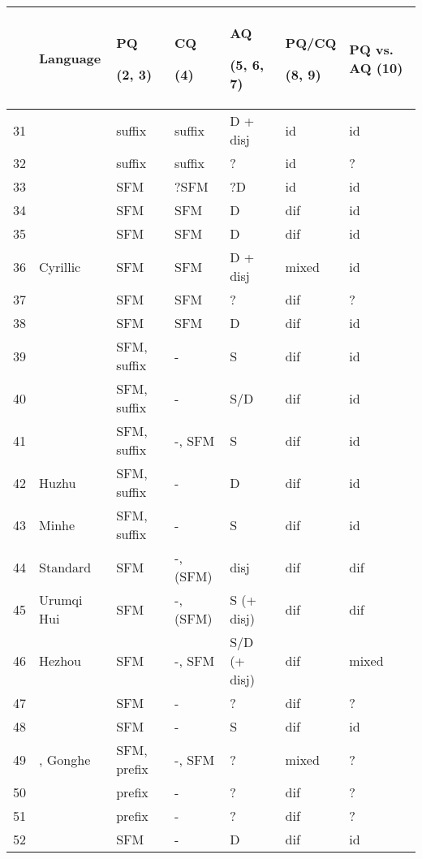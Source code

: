 \begin{tabularx}{\textwidth}{rQQQQQQ}
\lsptoprule
& \textbf{Language} & \textbf{PQ}

\textbf{(2, 3)} & \textbf{CQ}

\textbf{(4)} & \textbf{AQ}

\textbf{(5, 6, 7)} & \textbf{PQ/CQ}

\textbf{(8, 9)} & \textbf{PQ vs. AQ}  \textbf{(10)}\\
\midrule


31 &  & suffix & suffix & \textsc{D +} disj & id & id\\
32 &  & suffix & suffix & ? & id & ?\\
33 &  & SFM & ?SFM & ?D & id & id\\
34 &  & SFM & SFM & D & dif & id\\
35 &  & SFM & SFM & D & dif & id\\
36 & Cyrillic  & SFM & SFM & D + disj & mixed & id\\
37 &  & SFM & SFM & ? & dif & ?\\
38 &  & SFM & SFM & D & dif & id\\
39 &  & SFM, suffix & {}- & S & dif & id\\
40 &  & SFM, suffix & {}- & S/D & dif & id\\
41 &  & SFM, suffix & {}-, SFM & S & dif & id\\
42 & Huzhu  & SFM, suffix & {}- & D & dif & id\\
43 & Minhe  & SFM, suffix & {}- & S & dif & id\\
44 & Standard  & SFM & {}-, (SFM) & disj & dif & dif\\
45 & Urumqi Hui  & SFM & {}-, (SFM) & S (+ disj) & dif & dif\\
46 & Hezhou & SFM & {}-, SFM & S/D (+ disj) & dif & mixed\\
47 &  & SFM & {}- & ? & dif & ?\\
48 &  & SFM & {}- & S & dif & id\\
49 & , Gonghe & SFM, prefix & {}-, SFM & ? & mixed & ?\\
50 &  & prefix & {}- & ? & dif & ?\\
51 &  & prefix & {}- & ? & dif & ?\\
52 &  & SFM & {}- & D & dif & id\\

\end{tabularx}
